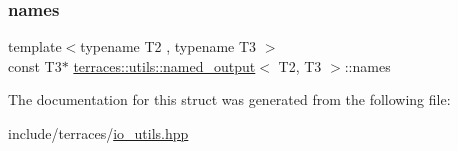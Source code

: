 \subsubsection{\texorpdfstring{names}{names}}
{\footnotesize\ttfamily template$<$typename T2 , typename T3 $>$ \\
const T3$\ast$ \hyperlink{structterraces_1_1utils_1_1named__output}{terraces\+::utils\+::named\+\_\+output}$<$ T2, T3 $>$\+::names}



The documentation for this struct was generated from the following file\+:\begin{DoxyCompactItemize}
\item 
include/terraces/\hyperlink{io__utils_8hpp}{io\+\_\+utils.\+hpp}\end{DoxyCompactItemize}
